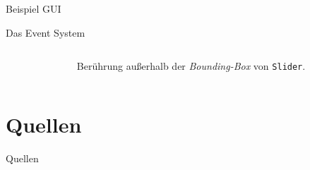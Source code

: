 \documentclass[12pt]{beamer}
\begin{document}
	\begin{frame}{Beispiel GUI}
		\centering
	\end{frame}

	\begin{frame}{Das Event System}
		\begin{columns}
			\begin{column}{0.6\textwidth}
				
			\end{column}
			\begin{column}{0.4\textwidth}
				\pause
				Berührung außerhalb der \emph{Bounding-Box} von \texttt{Slider}.
			\end{column}
		\end{columns}
		
	\end{frame}

	\section{Quellen}
	\begin{frame}{Quellen}
		\nocite{ts-holzinger}
		\nocite{I2C-spec_userManual}
		\nocite{stm32_refManual}
		\printbibliography
	\end{frame}
\end{document}
